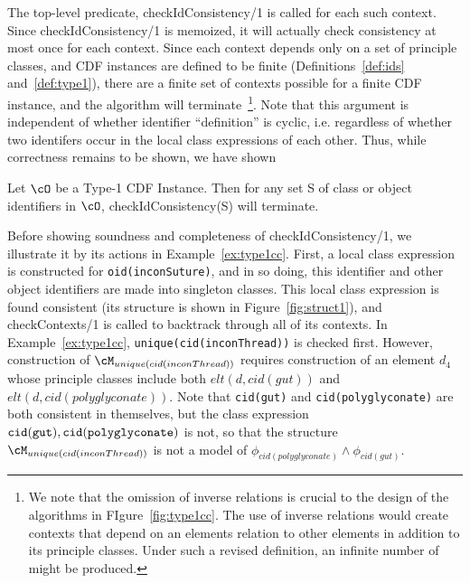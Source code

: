 The top-level predicate, {\sf checkIdConsistency/1} is called for
each such context.  Since {\sf checkIdConsistency/1} is memoized,
it will actually check consistency at most once for each context.
Since each context depends only on a set of principle classes, and CDF
instances are defined to be finite (Definitions~\ref{def:ids}
and~\ref{def:type1}), there are a finite set of contexts possible for
a finite CDF instance, and the algorithm will terminate~\footnote{We
note that the omission of inverse relations is crucial to the design
of the algorithms in FIgure~\ref{fig:type1cc}.  The use of inverse
relations would create contexts that depend on an elements relation to
other elements in addition to its principle classes.  Under such a
revised definition, an infinite number of might be produced.}.  Note
that this argument is independent of whether identifier ``definition''
is cyclic, i.e. regardless of whether two identifers occur in the
local class expressions of each other.  Thus, while correctness
remains to be shown, we have shown

\begin{lemma}
Let $\cO$ be a Type-1 CDF Instance.  Then for any set S of class or
object identifiers in $\cO$, {\sf checkIdConsistency(S)} will
terminate.
\end{lemma}

Before showing soundness and completeness of {\sf
checkIdConsistency/1}, we illustrate it by its actions in
Example~\ref{ex:type1cc}.  First, a local class expression is
constructed for {\tt oid(inconSuture)}, and in so doing, this
identifier and other object identifiers are made into singleton
classes.  This local class expression is found consistent (its
structure is shown in Figure~\ref{fig:struct1}), and {\sf
checkContexts/1} is called to backtrack through all of its contexts.
In Example~\ref{ex:type1cc}, {\tt unique(cid(inconThread))} is checked
first.  However, construction of $\cM_{unique(cid(inconThread))}$
requires construction of an element $d_4$ whose principle classes
include both $elt(d,cid(gut))$ and $elt(d,cid(polyglyconate))$.  Note
that {\tt cid(gut)} and {\tt cid(polyglyconate)} are both consistent
in themselves, but the class expression ${\tt cid(gut)},{\tt
cid(polyglyconate)}$ is not, so that the structure
$\cM_{unique(cid(inconThread))}$ is not a model of
$\phi_{cid(polyglyconate)} \wedge \phi_{cid(gut)}$.

